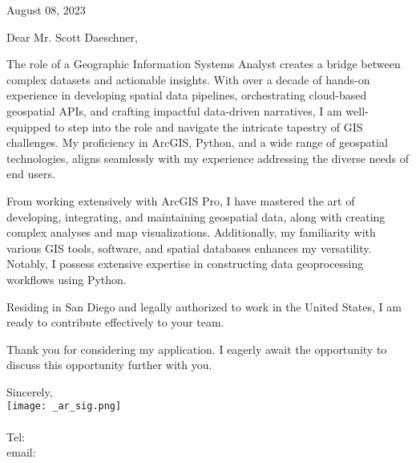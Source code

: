\documentclass[letterpaper]{article}
\begin{document}
\large

\null\hfill August 08, 2023
\vspace{1em}

Dear Mr. Scott Daeschner,

The role of a Geographic Information Systems Analyst creates a bridge between
complex datasets and actionable insights. With over a decade of hands-on
experience in developing spatial data pipelines, orchestrating cloud-based
geospatial APIs, and crafting impactful data-driven narratives, I am
well-equipped to step into the role and navigate the intricate tapestry of GIS
challenges. My proficiency in ArcGIS, Python, and a wide range of geospatial
technologies, aligns seamlessly with my experience addressing the diverse needs
of end users.

From working extensively with ArcGIS Pro, I have mastered the art of
developing, integrating, and maintaining geospatial data, along with creating
complex analyses and map visualizations. Additionally, my familiarity with
various GIS tools, software, and spatial databases enhances my versatility.
Notably, I possess extensive expertise in constructing data geoprocessing
workflows using Python.

Residing in San Diego and legally authorized to work in the United
States, I am ready to contribute effectively to your team.

Thank you for considering my application. I eagerly await the opportunity to
discuss this opportunity further with you.

Sincerely,\\
    \hspace{1em} 
    \texttt{[image: \_ar\_sig.png]} \\
    \CVsigname \\
    \small
    Tel: \CVphone \\
    email: \CVemail
\end{document}
